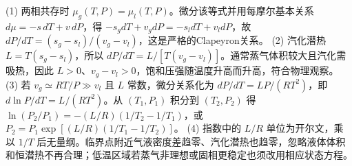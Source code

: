 (1) 两相共存时 \(\mu_g(T,P)=\mu_l(T,P)\)。微分该等式并用每摩尔基本关系 \(d\mu=-s\,dT+v\,dP\)，得 \(-s_gdT+v_gdP=-s_ldT+v_ldP\)，故 \(dP/dT=(s_g-s_l)/(v_g-v_l)\)，这是严格的Clapeyron关系。
(2) 汽化潜热 \(L=T(s_g-s_l)\)，所以 \(dP/dT=L/[T(v_g-v_l)]\)。通常蒸气体积较大且汽化需吸热，因此 \(L>0\)、\(v_g-v_l>0\)，饱和压强随温度升高而升高，符合物理观察。
(3) 若 \(v_g\simeq RT/P\gg v_l\) 且 \(L\) 常数，微分关系化为 \(dP/dT=LP/(RT^2)\)，即 \(d\ln P/dT=L/(RT^2)\)。从 \((T_1,P_1)\) 积分到 \((T_2,P_2)\) 得 \(\ln(P_2/P_1)=-(L/R)(1/T_2-1/T_1)\)，或 \(P_2=P_1\exp[(L/R)(1/T_1-1/T_2)]\)。
(4) 指数中的 \(L/R\) 单位为开尔文，乘以 \(1/T\) 后无量纲。临界点附近气液密度差趋零、汽化潜热也趋零，忽略液体体积和恒潜热不再合理；低温区域若蒸气非理想或固相更稳定也须改用相应状态方程。
